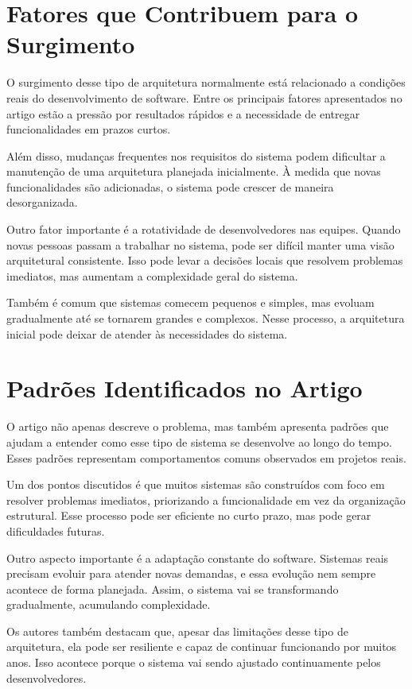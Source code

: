 \documentclass[conference]{IEEEtran}
\begin{document}
\section{Fatores que Contribuem para o Surgimento}

O surgimento desse tipo de arquitetura normalmente está relacionado a condições reais do desenvolvimento de software. Entre os principais fatores apresentados no artigo estão a pressão por resultados rápidos e a necessidade de entregar funcionalidades em prazos curtos.

Além disso, mudanças frequentes nos requisitos do sistema podem dificultar a manutenção de uma arquitetura planejada inicialmente. À medida que novas funcionalidades são adicionadas, o sistema pode crescer de maneira desorganizada.

Outro fator importante é a rotatividade de desenvolvedores nas equipes. Quando novas pessoas passam a trabalhar no sistema, pode ser difícil manter uma visão arquitetural consistente. Isso pode levar a decisões locais que resolvem problemas imediatos, mas aumentam a complexidade geral do sistema.

Também é comum que sistemas comecem pequenos e simples, mas evoluam gradualmente até se tornarem grandes e complexos. Nesse processo, a arquitetura inicial pode deixar de atender às necessidades do sistema.

\section{Padrões Identificados no Artigo}

O artigo não apenas descreve o problema, mas também apresenta padrões que ajudam a entender como esse tipo de sistema se desenvolve ao longo do tempo. Esses padrões representam comportamentos comuns observados em projetos reais.

Um dos pontos discutidos é que muitos sistemas são construídos com foco em resolver problemas imediatos, priorizando a funcionalidade em vez da organização estrutural. Esse processo pode ser eficiente no curto prazo, mas pode gerar dificuldades futuras.

Outro aspecto importante é a adaptação constante do software. Sistemas reais precisam evoluir para atender novas demandas, e essa evolução nem sempre acontece de forma planejada. Assim, o sistema vai se transformando gradualmente, acumulando complexidade.

Os autores também destacam que, apesar das limitações desse tipo de arquitetura, ela pode ser resiliente e capaz de continuar funcionando por muitos anos. Isso acontece porque o sistema vai sendo ajustado continuamente pelos desenvolvedores.
\end{document}
